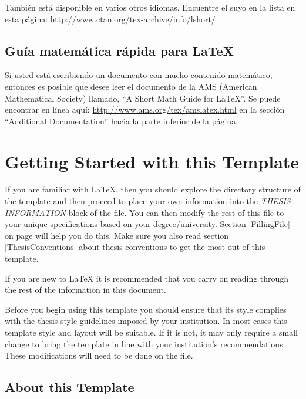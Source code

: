 También está disponible en varios otros idiomas. Encuentre el suyo en la lista en esta página: \url{http://www.ctan.org/tex-archive/info/lshort/}


\subsection{Guía matemática rápida para \LaTeX{}}

Si usted está escribiendo un documento con mucho contenido matemático, entonces es posible que desee leer el documento de la AMS (American Mathematical Society) llamado, \enquote{A Short Math Guide for \LaTeX{}}. Se puede encontrar en línea aquí: \url{http://www.ams.org/tex/amslatex.html} en la sección \enquote{Additional Documentation} hacia la parte inferior de la página.



\section{Getting Started with this Template}

If you are familiar with \LaTeX{}, then you should explore the directory structure of the template and then proceed to place your own information into the \emph{THESIS INFORMATION} block of the  file. You can then modify the rest of this file to your unique specifications based on your degree/university. Section \ref{FillingFile} on page \pageref{FillingFile} will help you do this. Make sure you also read section \ref{ThesisConventions} about thesis conventions to get the most out of this template.

If you are new to \LaTeX{} it is recommended that you carry on reading through the rest of the information in this document.

Before you begin using this template you should ensure that its style complies with the thesis style guidelines imposed by your institution. In most cases this template style and layout will be suitable. If it is not, it may only require a small change to bring the template in line with your institution's recommendations. These modifications will need to be done on the  file.

\subsection{About this Template}

